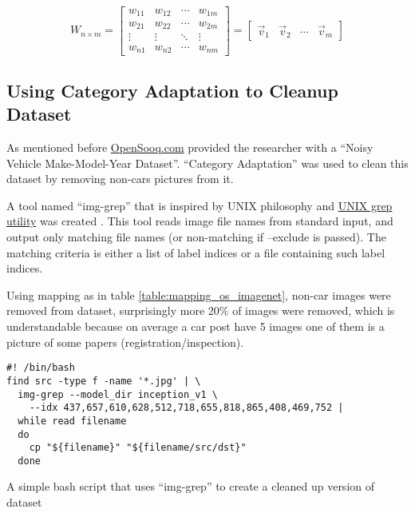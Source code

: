 \begin{equation}
W_{n\times m} =
\begin{bmatrix}
w_{11} & w_{12} & \cdots  &  w_{1m} \\
w_{21} & w_{22} & \cdots  &  w_{2m} \\
\vdots  & \vdots  & \ddots  &  \vdots  \\
w_{n1} & w_{n2} & \cdots  &  w_{nm}
\end{bmatrix}
=
\begin{bmatrix}
\vec{v}_{1} & \vec{v}_{2} & \cdots & \vec{v}_{m}
\end{bmatrix}
\label{eq:ann_weights}
\end{equation}

\subsection{Using Category Adaptation to Cleanup Dataset}

As mentioned before \href{http://opensooq.com}{OpenSooq.com} provided the researcher with
a ``Noisy Vehicle Make-Model-Year Dataset''.
``Category Adaptation'' was used to clean this dataset by removing non-cars pictures from it.

A tool named ``img-grep'' that is inspired by UNIX philosophy
and \href{http://pubs.opengroup.org/onlinepubs/009695399/utilities/grep.html}{UNIX grep utility} was created .
This tool reads image file names from standard input,
and output only matching file names (or non-matching if --exclude is passed).
The matching criteria is either a list of label indices or a file containing such label indices. 

Using mapping as in table \ref{table:mapping_os_imagenet}, non-car images were removed from dataset,
surprisingly more 20\% of images were removed, which is understandable because on average a car post have 5 images
one of them is a picture of some papers (registration/inspection).

\begin{program}
\begin{verbatim}
#! /bin/bash
find src -type f -name '*.jpg' | \
  img-grep --model_dir inception_v1 \
    --idx 437,657,610,628,512,718,655,818,865,408,469,752 |
  while read filename
  do
    cp "${filename}" "${filename/src/dst}"
  done
\end{verbatim}
\caption{A simple bash script that uses ``img-grep'' to create a cleaned up version of dataset}
\end{program}



